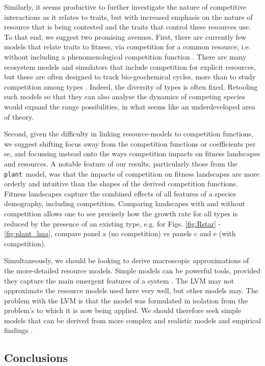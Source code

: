 \documentclass[a4paper,11pt]{article}
\newcommand{\plant}{{\tt plant}}
\begin{document}
Similarly, it seems productive to further investigate the nature of competitive interactions as it relates to traits, but with increased emphasis on the nature of resource that is being contested and the traits that control these resources use. To that end, we suggest two promising avenues. First, there are currently few models that relate traits to fitness, via competition for a common resource, i.e. without including a phenomenological competition function \citep{DAndrea-2016a}. There are many ecosystem models and simulators that include competition for explicit resources, but these are often designed to track bio-geochemical cycles, more than to study competition among types \citep{Fisher-2018}. Indeed, the diversity of types is often fixed. Retooling such models so that they can also analyse the dynamics of competing species would expand the range possibilities, in what seems like an underdeveloped area of theory.

Second, given the difficulty in linking resource-models to competition functions, we suggest shifting focus away from the competition functions or coefficients per se, and focussing instead onto the ways competition impacts on fitness landscapes and resources. A notable feature of our results, particularly those from the \plant\ model, was that the impacts of competition on fitness landscapes are more orderly and intuitive than the shapes of the derived competition functions. Fitness landscapes capture the combined effects of all features of a species demography, including competition. Comparing landscapes with and without competition allows one to see precisely how the growth rate for all types is reduced by the presence of an existing type, e.g. for Figs. \ref{fig:Rstar} - \ref{fig:plant_lma}, compare panel a (no competition) vs panels c and e (with competition). 

Simultaneously, we should be looking to derive macroscopic approximations of the more-detailed resource models. Simple models can be powerful tools, provided they capture the main emergent features of a system \citep{Levin-2006}. The LVM may not approximate the resource models used here very well, but other models may. The problem with the LVM is that the model was formulated in isolation from the problem's to which it is now being applied. We should therefore seek simple models that can be derived from more complex and realistic models and empirical findings \citep[e.g.][]{Champagnat-2006}.

\subsection{Conclusions}
\end{document}
